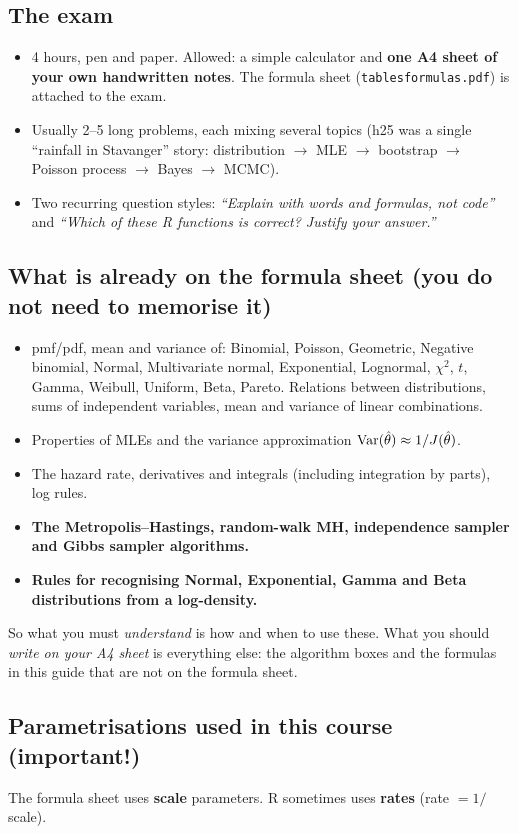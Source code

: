 \subsection*{The exam}
\begin{itemize}
  \item 4 hours, pen and paper. Allowed: a simple calculator and \textbf{one A4 sheet of your own handwritten notes}. The formula sheet (\texttt{tablesformulas.pdf}) is attached to the exam.
  \item Usually 2--5 long problems, each mixing several topics (h25 was a single ``rainfall in Stavanger'' story: distribution $\to$ MLE $\to$ bootstrap $\to$ Poisson process $\to$ Bayes $\to$ MCMC).
  \item Two recurring question styles: \emph{``Explain with words and formulas, not code''} and \emph{``Which of these R functions is correct? Justify your answer.''}
\end{itemize}

\subsection*{What is already on the formula sheet (you do not need to memorise it)}
\begin{itemize}
  \item pmf/pdf, mean and variance of: Binomial, Poisson, Geometric, Negative binomial, Normal, Multivariate normal, Exponential, Lognormal, $\chi^2$, $t$, Gamma, Weibull, Uniform, Beta, Pareto. Relations between distributions, sums of independent variables, mean and variance of linear combinations.
  \item Properties of MLEs and the variance approximation $\mathrm{Var}(\hat\theta) \approx 1/J(\hat\theta)$.
  \item The hazard rate, derivatives and integrals (including integration by parts), log rules.
  \item \textbf{The Metropolis--Hastings, random-walk MH, independence sampler and Gibbs sampler algorithms.}
  \item \textbf{Rules for recognising Normal, Exponential, Gamma and Beta distributions from a log-density.}
\end{itemize}
So what you must \emph{understand} is how and when to use these. What you should \emph{write on your A4 sheet} is everything else: the algorithm boxes and the formulas in this guide that are not on the formula sheet.

\subsection*{Parametrisations used in this course (important!)}
The formula sheet uses \textbf{scale} parameters. R sometimes uses \textbf{rates} (rate $=1/$scale).

